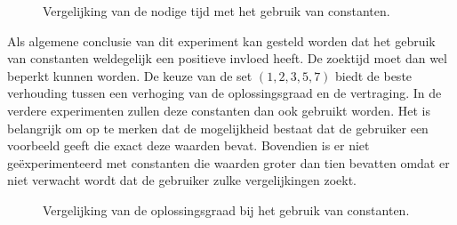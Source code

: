 \documentclass[Main.tex]{subfiles}
\begin{document}
\begin{figure}[!htb]
\centering
{}
\caption{Vergelijking van de nodige tijd met het gebruik van constanten.} \label{fig:gewichtenTijd}
\end{figure}



\par Als algemene conclusie van dit experiment kan gesteld worden dat het gebruik van constanten weldegelijk een positieve invloed heeft. De zoektijd moet dan wel beperkt kunnen worden. De keuze van de set $(1, 2, 3, 5, 7)$ biedt de beste verhouding tussen een verhoging van de oplossingsgraad en de vertraging. In de verdere experimenten zullen deze constanten dan ook gebruikt worden. Het is belangrijk om op te merken dat de mogelijkheid bestaat dat de gebruiker een voorbeeld geeft die exact deze waarden bevat. Bovendien is er niet ge\"experimenteerd met constanten die waarden groter dan tien bevatten omdat er niet verwacht wordt dat de gebruiker zulke vergelijkingen zoekt.


\begin{figure}[!htb]
\centering
{}
\caption{Vergelijking van de oplossingsgraad bij het gebruik van constanten.} \label{fig:gewichtenOplossingsgraad}
\end{figure}
\end{document}
